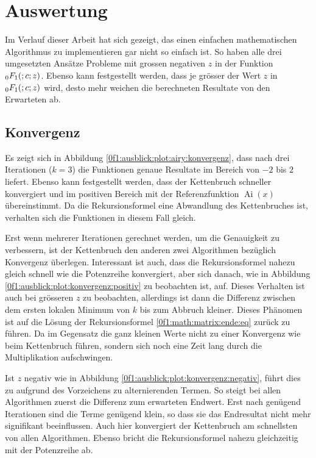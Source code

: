 %
%
%
\section{Auswertung
\label{0f1:section:teil3}}
Im Verlauf dieser Arbeit hat sich gezeigt, 
das einen einfachen mathematischen Algorithmus zu implementieren gar nicht so einfach ist.
So haben alle drei umgesetzten Ansätze Probleme mit grossen negativen $z$ in der Funktion $\mathstrut_0F_1(;c;z)$.
Ebenso kann festgestellt werden, dass je grösser der Wert $z$ in $\mathstrut_0F_1(;c;z)$ wird, desto mehr weichen die berechneten Resultate von den Erwarteten \cite{0f1:wolfram-0f1} ab.

\subsection{Konvergenz
\label{0f1:subsection:konvergenz}}
Es zeigt sich in Abbildung \ref{0f1:ausblick:plot:airy:konvergenz}, dass nach drei Iterationen ($k = 3$) die Funktionen genaue Resultate im Bereich von $-2$ bis $2$ liefert. Ebenso kann festgestellt werden, dass der Kettenbruch schneller konvergiert und im positiven Bereich mit der Referenzfunktion $\operatorname{Ai}(x)$ übereinstimmt. Da die Rekursionsformel eine Abwandlung des Kettenbruches ist, verhalten sich die Funktionen in diesem Fall gleich.

Erst wenn mehrerer Iterationen gerechnet werden, um die Genauigkeit zu verbessern, ist der Kettenbruch den anderen zwei Algorithmen bezüglich Konvergenz überlegen. 
Interessant ist auch, dass die Rekursionsformel nahezu gleich schnell wie die Potenzreihe konvergiert, aber sich danach, wie in Abbildung \ref{0f1:ausblick:plot:konvergenz:positiv} zu beobachten ist, auf. Dieses Verhalten ist auch bei grösseren $z$ zu beobachten, allerdings ist dann die Differenz zwischen dem ersten lokalen Minimum von $k$ bis zum Abbruch kleiner.
Dieses Phänomen ist auf die Lösung der Rekursionsformel \eqref{0f1:math:matrix:ende:eq} zurück zu führen. Da im Gegensatz die ganz kleinen Werte nicht zu einer Konvergenz wie beim Kettenbruch führen, sondern sich noch eine Zeit lang durch die Multiplikation aufschwingen.

Ist $z$ negativ wie in Abbildung \ref{0f1:ausblick:plot:konvergenz:negativ}, führt dies zu aufgrund des Vorzeichens zu alternierenden Termen. So steigt bei allen Algorithmen zuerst die Differenz zum erwarteten Endwert. Erst nach genügend Iterationen sind die Terme genügend klein, so dass sie das Endresultat nicht mehr signifikant beeinflussen.
Auch hier konvergiert der Kettenbruch am schnellsten von allen Algorithmen. Ebenso bricht die Rekursionsformel nahezu gleichzeitig mit der Potenzreihe ab.

